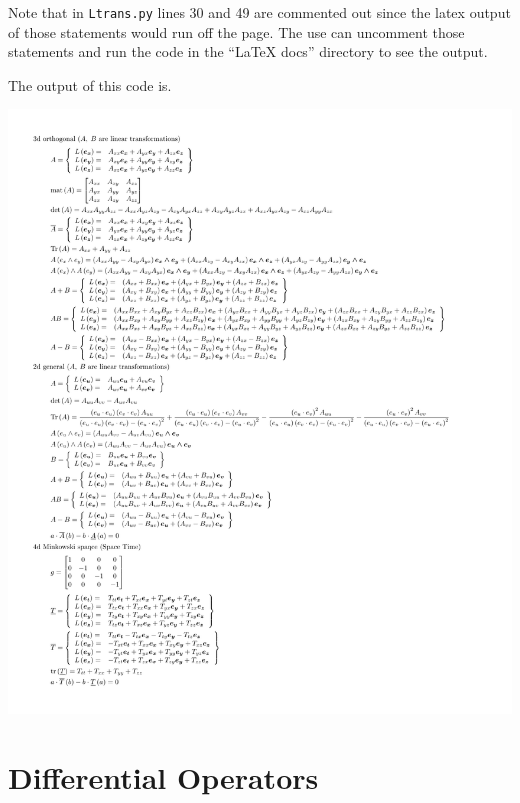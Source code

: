 \documentclass[12pt]{report}
\newcommand{\T}[1]{\texttt{#1}}
\newcommand{\includecode}[1]{}
\begin{document}
Note that in \T{Ltrans.py} lines 30 and 49 are commented out since the latex output of those statements would run off the page.  The
use can uncomment those statements and run the code in the ``LaTeX docs'' directory to see the output.
\includecode{python/Ltrans.py}
\newpage The output of this code is.
\begin{center}
    \includegraphics[scale=0.60]{python/Ltrans.pdf}
\end{center}

\section{Differential Operators}
\end{document}

